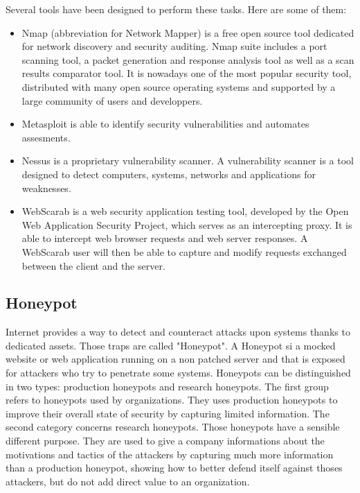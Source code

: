 Several tools have been designed to perform these tasks. Here are some of them:
\begin{itemize}{} \renewcommand{\labelitemi}{$\circ$} \item Nmap (abbreviation
for Network Mapper) is a free open source tool dedicated for network discovery
and security auditing. Nmap suite includes a port scanning tool, a packet
generation and response analysis tool as well as a scan results comparator tool.
It is nowadays one of the most popular security tool, distributed with many open
source operating systems and supported by a large community of users and
developpers. \item Metasploit is able to identify security vulnerabilities and
automates assesments. \item Nessus is a proprietary vulnerability scanner. A
vulnerability scanner is a tool designed to detect computers, systems, networks
and applications for weaknesses. \item WebScarab is a web security application
testing tool, developed by the Open Web Application Security Project, which
serves as an intercepting proxy. It is able to intercept web browser requests
and web server responses. A WebScarab user will then be able to capture and
modify requests exchanged between the client and the server. \end{itemize}

\subsection{Honeypot}
Internet provides a way to detect and counteract attacks upon systems thanks to
dedicated assets. Those traps are called "Honeypot". A Honeypot si a mocked
website or web application running on a non patched server and that is exposed
for attackers who try to penetrate some systems. Honeypots can be distinguished
in two types: production honeypots and research honeypots. The first group
refers to honeypots used by organizations. They uses production honeypots to
improve their overall state of security by capturing limited information. The
second category concerns research honeypots. Those honeypots have a sensible
different purpose. They are used to give a company informations about the
motivations and tactics of the attackers by capturing much more information than
a production honeypot, showing how to better defend itself against thoses
attackers, but do not add direct value to an organization.

